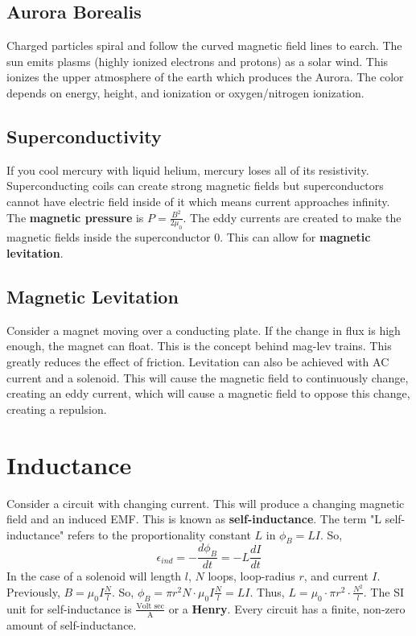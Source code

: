 \documentclass{article}
\begin{document}
\subsection{Aurora Borealis}
Charged particles spiral and follow the curved magnetic field lines to earch. The sun emits plasms (highly ionized electrons and protons)
as a solar wind. This ionizes the upper atmosphere of the earth which produces the Aurora. The color depends on energy, height, and ionization
or oxygen/nitrogen ionization.

\subsection{Superconductivity}
If you cool mercury with liquid helium, mercury loses all of its resistivity. Superconducting coils can create strong magnetic fields
but superconductors cannot have electric field inside of it which means current approaches infinity. The \textbf{magnetic pressure}
is $P=\frac{B^{2}}{2\mu_{0}}$. The eddy currents are created to make the magnetic fields inside the superconductor $0$.
This can allow for \textbf{magnetic levitation}.

\subsection{Magnetic Levitation}
Consider a magnet moving over a conducting plate. If the change in flux is high enough, the magnet can float. This is the concept behind
mag-lev trains. This greatly reduces the effect of friction. Levitation can also be achieved with AC current and a solenoid.
This will cause the magnetic field to continuously change, creating an eddy current, which will cause a magnetic field 
to oppose this change, creating a repulsion.

\section{Inductance}
Consider a circuit with changing current. This will produce a changing magnetic field and an induced EMF.
This is known as \textbf{self-inductance}. The term "L self-inductance" refers to the proportionality constant $L$
in $\phi_{B}=LI$. So, $$\epsilon_{ind}=-\frac{d\phi_{B}}{dt}=-L\frac{dI}{dt}$$
In the case of a solenoid will length $l$, $N$ loops, loop-radius $r$, and current $I$. Previously, $B=\mu_{0}I\frac{N}{l}$.
So, $\phi_{B}=\pi r^{2}N\cdot \mu_{0}I\frac{N}{l}=LI$. Thus, $L=\mu_{0}\cdot \pi r^{2}\cdot \frac{N^{2}}{l}$. The SI unit for 
self-inductance is $\frac{\text{Volt sec}}{\text{A}}$ or a \textbf{Henry}. Every circuit has a finite, non-zero amount of self-inductance.
\end{document}
